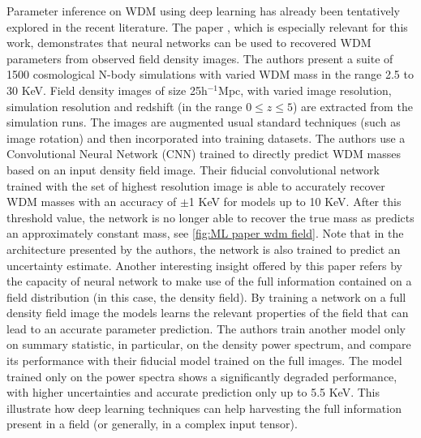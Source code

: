 \par
Parameter inference on WDM using deep learning has already been tentatively explored in the recent literature.
The paper  \cite{wdm_from_field}, which is especially relevant for this work, demonstrates that neural networks can be used to recovered WDM parameters from observed field density images. The authors present a suite of 1500 cosmological N-body simulations with varied WDM mass in the range 2.5 to 30 KeV. Field density images of size 25h$^{-1}$Mpc, with varied image resolution, simulation resolution and redshift (in the range $0\leq z \leq 5$) are extracted from the simulation runs. The images are augmented usual standard techniques (such as image rotation) and then incorporated into training datasets. The authors use a Convolutional Neural Network (CNN) trained to directly predict WDM masses based on an input density field image. Their fiducial convolutional network trained with the set of highest resolution image is able to accurately recover WDM masses with an accuracy of $\pm$1 KeV for models up to 10 KeV. After this threshold value, the network is no longer able to recover the true mass as predicts an approximately constant mass, see \cref{fig:ML paper wdm field}. Note that in the architecture presented by the authors, the network is also trained to predict an uncertainty estimate. Another interesting insight offered by this paper refers by the capacity of neural network to make use of the full information contained on a field distribution (in this case, the density field). By training a network on a full density field image the models learns the relevant properties of the field that can lead to an accurate parameter prediction. The authors train another model only on summary statistic, in particular, on the density power spectrum, and compare its performance with their fiducial model trained on the full images. The model trained only on the power spectra shows a significantly degraded performance, with higher uncertainties and accurate prediction only up to 5.5 KeV. This illustrate how deep learning techniques can help harvesting the full information present in a field (or generally, in a complex input tensor).



